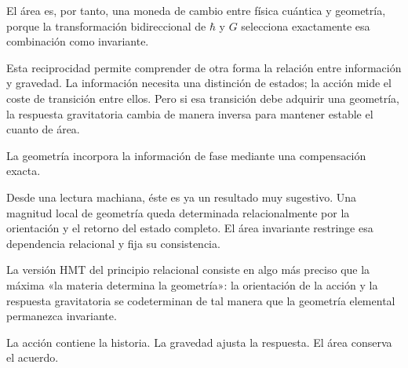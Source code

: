 El área es, por tanto, una moneda de cambio entre física cuántica y geometría, porque la transformación bidireccional de \(\hbar\) y \(G\) selecciona exactamente esa combinación como invariante.\par

Esta reciprocidad permite comprender de otra forma la relación entre información y gravedad. La información necesita una distinción de estados; la acción mide el coste de transición entre ellos. Pero si esa transición debe adquirir una geometría, la respuesta gravitatoria cambia de manera inversa para mantener estable el cuanto de área.\par

La geometría incorpora la información de fase mediante una compensación exacta.\par

Desde una lectura machiana, éste es ya un resultado muy sugestivo. Una magnitud local de geometría queda determinada relacionalmente por la orientación y el retorno del estado completo. El área invariante restringe esa dependencia relacional y fija su consistencia.\par

La versión HMT del principio relacional consiste en algo más preciso que la máxima «la materia determina la geometría»: la orientación de la acción y la respuesta gravitatoria se codeterminan de tal manera que la geometría elemental permanezca invariante.\par

La acción contiene la historia. La gravedad ajusta la respuesta. El área conserva el acuerdo.\par

